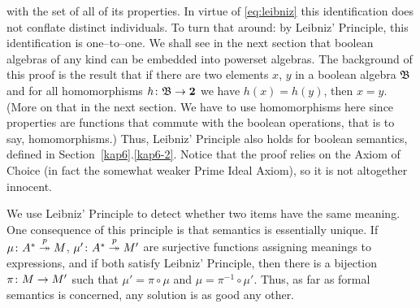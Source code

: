 with the set of all of its properties. In virtue of \eqref{eq:leibniz}
this identification does not conflate distinct individuals. To turn
that around: by Leibniz' Principle, this identification is
one--to--one. We shall see in the next section that boolean algebras
of any kind can be embedded into powerset algebras. The background of
this proof is the result that if there are two elements $x$, $y$ in a
boolean algebra $\mathfrak{B}$ and for all homomorphisms $h \colon \mathfrak{B}  \rightarrow 
\mathbf{2}$ we have $h(x) = h(y)$, then $x = y$. (More on that in 
the next section. We have to use homomorphisms here since properties are
functions that commute with the boolean operations, that is to say,
homomorphisms.) Thus, Leibniz' Principle also holds for boolean
semantics, defined in Section~\ref{kap6}.\ref{kap6-2}. Notice that the proof
relies on the Axiom of Choice (in fact the somewhat weaker Prime
Ideal Axiom), so it is not altogether innocent.

We use Leibniz' Principle to detect whether two items have the same
meaning. One consequence of this principle is that semantics is
essentially unique. If $\mu \colon A^{\ast} \stackrel{p}{\twoheadrightarrow} M$,
$\mu' \colon A^{\ast} \stackrel{p}{\twoheadrightarrow} M'$ are surjective functions
assigning meanings to expressions, and if both satisfy Leibniz'
Principle, then there is a bijection $\pi \colon M \rightarrow M'$  such that
$\mu' = \pi \circ \mu$ and $\mu = \pi^{-1} \circ \mu'$. Thus, as
far as formal semantics is concerned, any solution is as good any
other. 

